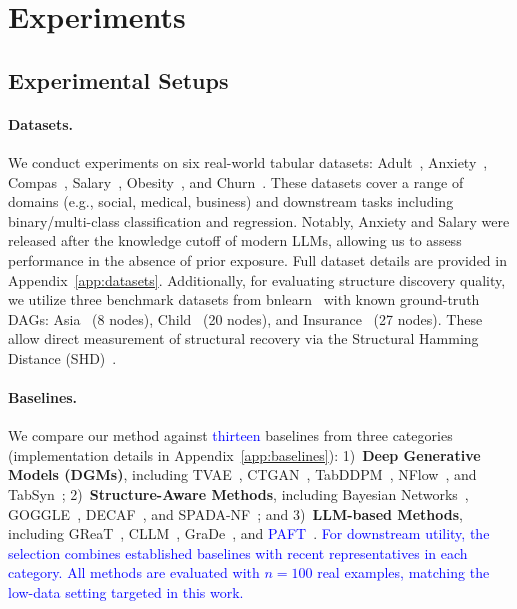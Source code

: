 \section{Experiments}
\subsection{Experimental Setups}
\paragraph{Datasets.}
We conduct experiments on six real-world tabular datasets: Adult~\cite{adult_2}, Anxiety~\cite{kaggleSocialAnxiety}, Compas~\cite{propublicaMachineBias}, Salary~\cite{kaggleGlobalMarket}, Obesity~\cite{obesity}, and Churn~\cite{churn}. These datasets cover a range of domains (e.g., social, medical, business) and downstream tasks including binary/multi-class classification and regression. Notably, Anxiety and Salary were released after the knowledge cutoff of modern LLMs, allowing us to assess performance in the absence of prior exposure. Full dataset details are provided in Appendix~\ref{app:datasets}. Additionally, for evaluating structure discovery quality, we utilize three benchmark datasets from bnlearn~\cite{scutari2010learning} with known ground-truth DAGs: Asia~\cite{bnlearn-repo-asia} (8 nodes), Child~\cite{bnlearn-repo-child} (20 nodes), and Insurance~\cite{bnlearn-repo-insurance} (27 nodes). These allow direct measurement of structural recovery via the Structural Hamming Distance (SHD)~\cite{de2009comparison}. 


\paragraph{Baselines.}
We compare our method against \textcolor{blue}{thirteen} baselines from three categories (implementation details in Appendix~\ref{app:baselines}): 1)~\textbf{Deep Generative Models (DGMs)}, including TVAE~\cite{xu2019modeling}, CTGAN~\cite{xu2019modeling}, TabDDPM~\cite{kotelnikov2023tabddpm}, NFlow~\cite{papamakarios2021normalizing}, and TabSyn~\cite{tabsyn}; 2)~\textbf{Structure-Aware Methods}, including Bayesian Networks~\cite{ankan2015pgmpy}, GOGGLE~\cite{liu2023goggle}, DECAF~\cite{van2021decaf}, and SPADA-NF~\cite{yang2025doubling}; and 3)~\textbf{LLM-based Methods}, including GReaT~\cite{borisov2023language}, CLLM~\cite{cllm2024}, GraDe~\cite{zhang-etal-2025-features}, and \textcolor{blue}{PAFT~\cite{xu2024why}}.
\textcolor{blue}{For downstream utility, the selection combines established baselines with recent representatives in each category. All methods are evaluated with $n=100$ real examples, matching the low-data setting targeted in this work.}

